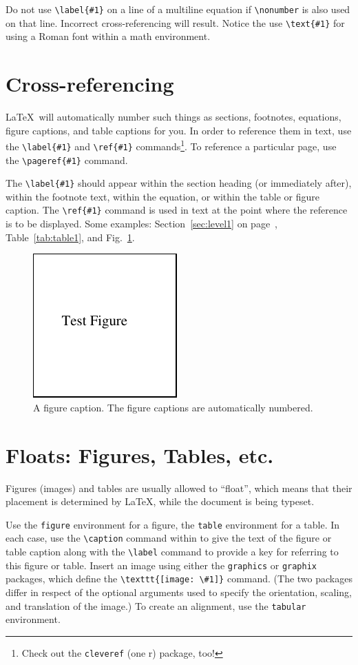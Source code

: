 \documentclass[]{article}
\begin{document}
Do not use \verb+\label{#1}+ on a line of a multiline equation if \verb+\nonumber+ is also used on that line. Incorrect cross-referencing will result. Notice the use \verb+\text{#1}+ for using a Roman font within a math environment.

\section{Cross-referencing}
\LaTeX\ will automatically number such things as sections, footnotes, equations, figure captions, and table captions for you. In order to reference them in text, use the \verb+\label{#1}+ and \verb+\ref{#1}+ commands\footnote{Check out the \texttt{cleveref} (one r) package, too!}. To reference a particular page, use the \verb+\pageref{#1}+ command.

The \verb+\label{#1}+ should appear within the section heading (or immediately after), within the footnote text, within the equation, or within the table or figure caption. The \verb+\ref{#1}+ command is used in text at the point where the reference is to be displayed.  Some examples: Section~\ref{sec:level1} on page~\pageref{sec:level1}, Table~\ref{tab:table1}, and Fig.~\ref{fig:epsart}.
\begin{figure}[b]
  \centering
  \includegraphics{figures/fig_1}%
  \caption{\label{fig:epsart} A figure caption. The figure captions are automatically numbered.}
\end{figure}

\section{Floats: Figures, Tables, etc.}
Figures (images) and tables are usually allowed to ``float'', which means that their placement is determined by \LaTeX, while the document is being typeset. 

Use the \texttt{figure} environment for a figure, the \texttt{table} environment for a table. In each case, use the \verb+\caption+ command within to give the text of the figure or table caption along with the \verb+\label+ command to provide a key for referring to this figure or table. Insert an image using either the \texttt{graphics} or \texttt{graphix} packages, which define the \verb+\texttt{[image: \#1]}+ command. (The two packages differ in respect of the optional arguments used to specify the orientation, scaling, and translation of the image.) To create an alignment, use the \texttt{tabular} environment. 
\end{document}
